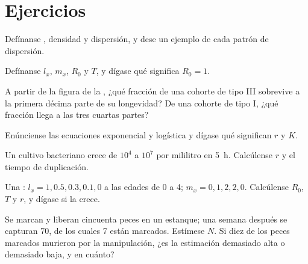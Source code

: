 \section{Ejercicios}

\begin{exercise}[$\star$]\label{exo:b1:populations:1}
Defínanse , densidad y dispersión, y dese un ejemplo de cada patrón
de dispersión.
\end{exercise}

\begin{exercise}[$\star$]\label{exo:b1:populations:2}
Defínanse $l_x$, $m_x$, $R_0$ y $T$, y dígase qué significa $R_0 = 1$.
\end{exercise}

\begin{exercise}[$\star$]\label{exo:b1:populations:3}
A partir de la figura de la , ¿qué fracción de una cohorte de
tipo III sobrevive a la primera décima parte de su longevidad? De una
cohorte de tipo I, ¿qué fracción llega a las tres cuartas partes?
\end{exercise}

\begin{exercise}[$\star$]\label{exo:b1:populations:4}
Enúnciense las ecuaciones exponencial y logística y dígase qué significan
$r$ y $K$.
\end{exercise}

\begin{exercise}[$\star\star$]\label{exo:b1:populations:5}
Un cultivo bacteriano crece de $10^4$ a $10^7$  por mililitro en
\qty{5}{h}. Calcúlense $r$ y el tiempo de duplicación.
\end{exercise}

\begin{exercise}[$\star\star$]\label{exo:b1:populations:6}
Una : $l_x = 1, 0.5, 0.3, 0.1, 0$ a las edades de 0 a 4;
$m_x = 0,
1, 2, 2, 0$. Calcúlense $R_0$, $T$ y $r$, y dígase si la
 crece.
\end{exercise}

\begin{exercise}[$\star\star$]\label{exo:b1:populations:7}
Se marcan y liberan cincuenta peces en un estanque; una semana después se
capturan 70, de los cuales 7 están marcados. Estímese $N$. Si diez de los
peces marcados murieron por la manipulación, ¿es la estimación demasiado
alta o demasiado baja, y en cuánto?
\end{exercise}

